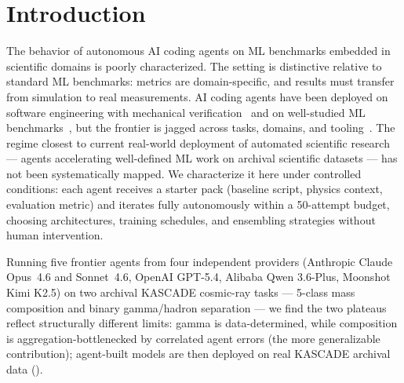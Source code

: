 \documentclass[universe,article,submit,pdftex,oneauthor]{Definitions/mdpi}
\begin{document}
\section{Introduction}
\label{sec:intro}

The behavior of autonomous AI coding agents on ML benchmarks embedded in scientific domains is poorly characterized. The setting is distinctive relative to standard ML benchmarks: metrics are domain-specific, and results must transfer from simulation to real measurements. AI coding agents have been deployed on software engineering with mechanical verification~\cite{cloudflare_vinext,anthropic_ccompiler,openai_harness} and on well-studied ML benchmarks~\cite{karpathy_autoresearch,papailiopoulos_adderboard}, but the frontier is jagged across tasks, domains, and tooling~\cite{jagged_frontier,mlebench}. The regime closest to current real-world deployment of automated scientific research --- agents accelerating well-defined ML work on archival scientific datasets --- has not been systematically mapped. We characterize it here under controlled conditions: each agent receives a starter pack (baseline script, physics context, evaluation metric) and iterates fully autonomously within a 50-attempt budget, choosing architectures, training schedules, and ensembling strategies without human intervention.

Running five frontier agents from four independent providers (Anthropic Claude Opus~4.6 and Sonnet~4.6, OpenAI GPT-5.4, Alibaba Qwen 3.6-Plus, Moonshot Kimi K2.5) on two archival KASCADE cosmic-ray tasks --- 5-class mass composition and binary gamma/hadron separation --- we find the two plateaus reflect structurally different limits: gamma is data-determined, while composition is aggregation-bottlenecked by correlated agent errors (the more generalizable contribution); agent-built models are then deployed on real KASCADE archival data ().
\end{document}
